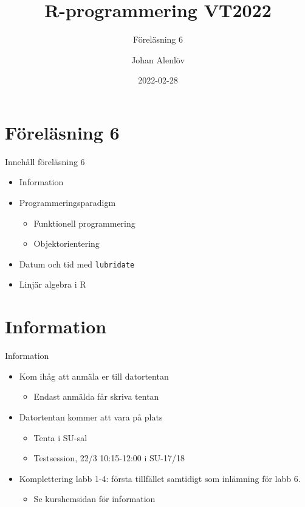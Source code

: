 \documentclass[
  11pt,
  ignorenonframetext,
  handout]{beamer}
\title{R-programmering VT2022}
\subtitle{Föreläsning 6}
\author{Johan Alenlöv}
\date{2022-02-28}
\institute{Linköpings Universitet}
\providecommand{\tightlist}{%
  \setlength{\itemsep}{0pt}\setlength{\parskip}{0pt}}
\begin{document}
\frame{\titlepage}

\hypertarget{fuxf6reluxe4sning-6}{%
\section{Föreläsning 6}\label{fuxf6reluxe4sning-6}}

\begin{frame}{Innehåll föreläsning 6}
\protect\hypertarget{innehuxe5ll-fuxf6reluxe4sning-6}{}
\begin{itemize}
\tightlist
\item
  Information
\item
  Programmeringsparadigm

  \begin{itemize}
  \tightlist
  \item
    Funktionell programmering
  \item
    Objektorientering
  \end{itemize}
\item
  Datum och tid med \texttt{lubridate}
\item
  Linjär algebra i R
\end{itemize}
\end{frame}

\hypertarget{information}{%
\section{Information}\label{information}}

\begin{frame}{Information}
\protect\hypertarget{information-1}{}
\begin{itemize}
\tightlist
\item
  Kom ihåg att anmäla er till datortentan

  \begin{itemize}
  \tightlist
  \item
    Endast anmälda får skriva tentan
  \end{itemize}
\item
  Datortentan kommer att vara på plats

  \begin{itemize}
  \tightlist
  \item
    Tenta i SU-sal
  \item
    Testsession, 22/3 10:15-12:00 i SU-17/18
  \end{itemize}
\item
  Komplettering labb 1-4: första tillfället samtidigt som inlämning för
  labb 6.

  \begin{itemize}
  \tightlist
  \item
    Se kurshemsidan för information
  \end{itemize}
\end{itemize}
\end{frame}
\end{document}
